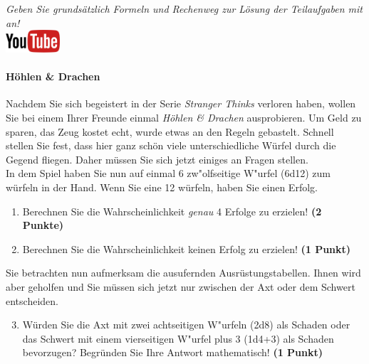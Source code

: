 \documentclass[a4paper, 9pt]{scrartcl}\usepackage[]{graphicx}\usepackage[]{xcolor}
\begin{document}
\textit{Geben Sie grunds{\"a}tzlich Formeln und Rechenweg zur L{\"o}sung der
  Teilaufgaben mit an!} \\[1Ex]

\hfill\href{https://youtu.be/8Pb2sKUIMyk}{\includegraphics[width =
  2cm]{img/youtube}} %
\hspace{2Ex}

\paragraph{H{\"o}hlen \& Drachen}



Nachdem Sie sich begeistert in der Serie \textit{Stranger Thinks} verloren
haben, wollen Sie bei einem Ihrer Freunde einmal \textit{H{\"o}hlen \& Drachen}
ausprobieren. Um Geld zu sparen, das Zeug kostet echt, wurde etwas an den
Regeln gebastelt. Schnell stellen Sie fest, dass hier ganz sch{\"o}n viele
unterschiedliche W{\"u}rfel durch die Gegend fliegen. Daher m{\"u}ssen Sie sich
jetzt einiges an Fragen stellen. \\%

In dem Spiel haben Sie nun auf einmal 6 zw{"o}lfseitige W{"u}rfel (6d12) zum w{\"u}rfeln in der Hand. Wenn Sie eine 12 w{\"u}rfeln,
haben Sie einen Erfolg.

\begin{enumerate}
\item Berechnen Sie die Wahrscheinlichkeit \textit{genau}
  4 Erfolge zu erzielen!  \textbf{(2 Punkte)}
\item Berechnen Sie die Wahrscheinlichkeit keinen Erfolg zu erzielen!
  \textbf{(1 Punkt)}
\end{enumerate}

Sie betrachten nun aufmerksam die ausufernden Ausr{\"u}stungstabellen. Ihnen
wird aber geholfen und Sie m{\"u}ssen sich jetzt nur zwischen der Axt oder dem
Schwert entscheiden.

\begin{enumerate}
  \setcounter{enumi}{2}
\item W{\"u}rden Sie die Axt mit zwei achtseitigen W{"u}rfeln (2d8) als Schaden oder
  das Schwert mit einem vierseitigen W{"u}rfel plus 3 (1d4+3) als Schaden bevorzugen?
  Begr{\"u}nden Sie Ihre Antwort mathematisch! \textbf{(1 Punkt)}
\end{enumerate}
\end{document}
